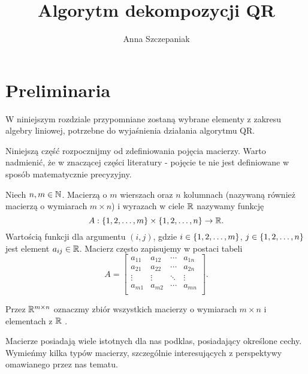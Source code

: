 \documentclass[10pt,a4paper]{report}
\author{Anna Szczepaniak}
\title{Algorytm dekompozycji QR}
\newcommand{\mx}[1]{{#1}}
\begin{document}
\maketitle


\tableofcontents


\chapter{Preliminaria}

W niniejszym rozdziale przypomniane zostaną wybrane elementy z zakresu algebry liniowej, potrzebne do wyjaśnienia działania algorytmu QR.


Niniejszą część rozpocznijmy od zdefiniowania pojęcia macierzy. Warto nadmienić, że w znaczącej części literatury - pojęcie te nie jest definiowane w sposób matematycznie precyzyjny.

\begin{definition}
Niech $n,m \in \mathbb{N}$. Macierzą o $m$ wierszach oraz $n$ kolumnach (nazywaną również macierzą o wymiarach $m \times n$) i wyrazach w ciele $\mathbb{R}$ nazywamy funkcję 
$$
\mx{A}: \set{1,2, \ldots ,m}\times \set{1,2, \ldots ,n} \to \setR.
$$
Wartością funkcji dla argumentu $(i,j)$, gdzie $i \in \left\lbrace {1,2, \ldots ,m} \right\rbrace$, $j \in \left\lbrace {1,2, \ldots ,n} \right\rbrace$ jest element $a_{ij} \in \mathbb{R}$. Macierz często zapisujemy w postaci tabeli
$$
\mx{A} = \begin{bmatrix}
 a_{11} & a_{12} & \cdots & a_{1n} \\
         a_{21} & a_{22} & \cdots & a_{2n} \\
         \vdots & \vdots & \ddots & \vdots \\
         a_{m1} & a_{m2} & \cdots & a_{mn} \\
\end{bmatrix}.
$$

Przez $\mathbb{R}^{m \times n}$ oznaczmy zbiór wszystkich macierzy o wymiarach $m \times n$ i elementach z $\mathbb{R}$ .
\end{definition}

Macierze posiadają wiele istotnych dla nas podklas, posiadający określone cechy. Wymieńmy kilka typów macierzy, szczególnie interesujących z perspektywy omawianego przez nas tematu.
\end{document}
